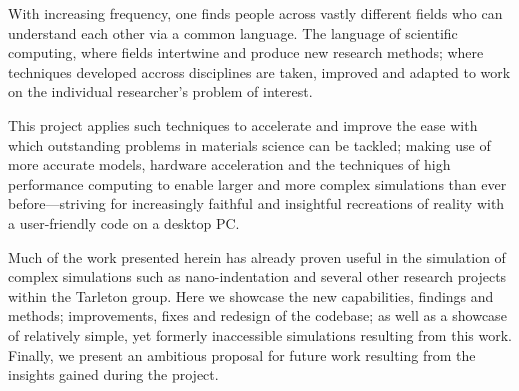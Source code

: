 With increasing frequency, one finds people across vastly different fields who can understand each other via a common language. The language of scientific computing, where fields intertwine and produce new research methods; where techniques developed accross disciplines are taken, improved and adapted to work on the individual researcher's problem of interest.

This project applies such techniques to accelerate and improve the ease with which outstanding problems in materials science can be tackled; making use of more accurate models, hardware acceleration and the techniques of high performance computing to enable larger and more complex simulations than ever before---striving for increasingly faithful and insightful recreations of reality with a user-friendly code on a desktop PC.

Much of the work presented herein has already proven useful in the simulation of complex simulations such as nano-indentation \cite{YU2018} and several other research projects within the Tarleton group. Here we showcase the new capabilities, findings and methods; improvements, fixes and redesign of the codebase; as well as a showcase of relatively simple, yet formerly inaccessible simulations resulting from this work. Finally, we present an ambitious proposal for future work resulting from the insights gained during the project.
\savearabiccounter

